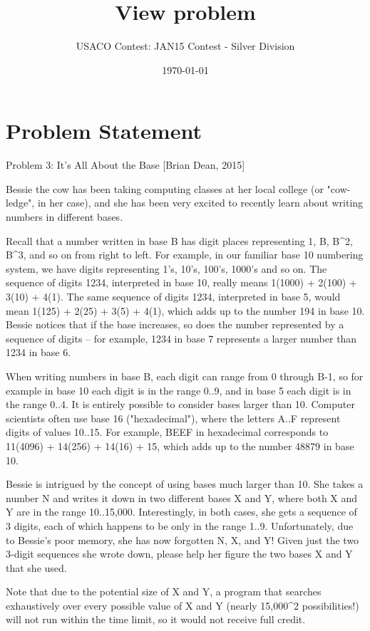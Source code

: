 \documentclass[12pt]{article}
\title{View problem}
\author{USACO Contest: JAN15 Contest - Silver Division}
\date{\today}
\begin{document}
\maketitle

\section*{Problem Statement}

Problem 3: It's All About the Base [Brian Dean, 2015]

Bessie the cow has been taking computing classes at her local college
(or "cow-ledge", in her case), and she has been very excited to
recently learn about writing numbers in different bases.

Recall that a number written in base B has digit places representing
1, B, B^2, B^3, and so on from right to left.  For example, in our
familiar base 10 numbering system, we have digits representing 1's,
10's, 100's, 1000's and so on. The sequence of digits 1234,
interpreted in base 10, really means 1(1000) + 2(100) + 3(10) + 4(1).
The same sequence of digits 1234, interpreted in base 5, would mean
1(125) + 2(25) + 3(5) + 4(1), which adds up to the number 194 in base
10.  Bessie notices that if the base increases, so does the number
represented by a sequence of digits -- for example, 1234 in base 7
represents a larger number than 1234 in base 6.

When writing numbers in base B, each digit can range from 0 through
B-1, so for example in base 10 each digit is in the range 0..9, and in
base 5 each digit is in the range 0..4.  It is entirely possible to
consider bases larger than 10.  Computer scientists often use base 16
("hexadecimal"), where the letters A..F represent digits of values
10..15.  For example, BEEF in hexadecimal corresponds to 11(4096) +
14(256) + 14(16) + 15, which adds up to the number 48879 in base 10.

Bessie is intrigued by the concept of using bases much larger than 10.
She takes a number N and writes it down in two different bases X and
Y, where both X and Y are in the range 10..15,000.  Interestingly, in
both cases, she gets a sequence of 3 digits, each of which happens to
be only in the range 1..9.  Unfortunately, due to Bessie's poor
memory, she has now forgotten N, X, and Y!  Given just the two 3-digit
sequences she wrote down, please help her figure the two bases X and Y
that she used.

Note that due to the potential size of X and Y, a program that
searches exhaustively over every possible value of X and Y (nearly
15,000^2 possibilities!) will not run within the time limit, so it
would not receive full credit.
\end{document}
